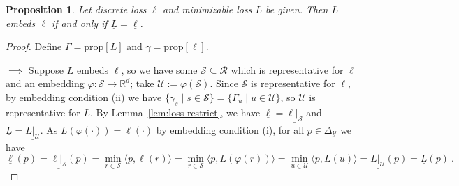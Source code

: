 \documentclass[11pt]{article}
\newcommand{\reals}{\mathbb{R}}
\newcommand{\prop}[1]{\mathrm{prop}[#1]}
\newcommand{\simplex}{\Delta_\Y}
\newcommand{\R}{\mathcal{R}}
\newcommand{\Sc}{\mathcal{S}}
\newcommand{\U}{\mathcal{U}}
\newcommand{\Y}{\mathcal{Y}}
\newcommand{\risk}[1]{\underline{#1}}
\newcommand{\inprod}[2]{\langle #1, #2 \rangle}%
\newtheorem{proposition}{Proposition}
\begin{document}
\begin{proposition}\label{prop:embed-bayes-risks}
  Let discrete loss $\ell$ and minimizable loss $L$ be given.
  Then $L$ embeds $\ell$ if and only if $\risk{L}=\risk{\ell}$.
\end{proposition}
\begin{proof}
  Define $\Gamma = \prop{L}$ and $\gamma = \prop{\ell}$.
  
  $\implies$
  Suppose $L$ embeds $\ell$, so we have some $\Sc\subseteq \R$ which is representative for $\ell$ and an embedding $\varphi:\Sc\to\reals^d$; take $\U := \varphi(\Sc)$.
  Since $\Sc$ is representative for $\ell$, by embedding condition (ii) we have $\{\gamma_s \mid s\in\Sc\} = \{\Gamma_u \mid u\in\U\}$, so $\U$ is representative for $L$.
  By Lemma~\ref{lem:loss-restrict}, we have $\risk{\ell} = \risk{\ell|_{\Sc}}$ and $\risk{L} = \risk{L|_{\U}}$.
  As $L(\varphi(\cdot)) = \ell(\cdot)$ by embedding condition (i), for all $p\in\simplex$ we have
  \begin{equation*}
    \risk{\ell}(p) = \risk{\ell|_\Sc}(p) = \min_{r \in \Sc}\inprod{p}{\ell(r)} = \min_{r \in \Sc}\inprod{p}{L(\varphi(r))} = \min_{u \in \U}\inprod{p}{L(u)} = \risk{L|_\U}(p) = \risk{L}(p)~.
  \end{equation*}
  

\end{proof}
\end{document}
